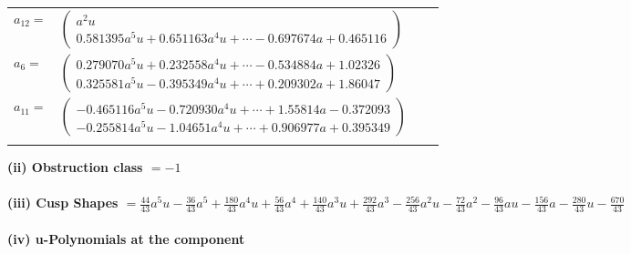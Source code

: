 \documentclass[1p]{elsarticle_modified}
\theoremstyle{definition}
\begin{document}
\begin{tabular}{m{7pt} m{180pt} m{7pt} m{180pt} }
\flushright $a_{12}=$&$\begin{pmatrix}a^2 u\\0.581395 a^{5} u+0.651163 a^{4} u+\cdots-0.697674 a+0.465116\end{pmatrix}$ \\
\flushright $a_{6}=$&$\begin{pmatrix}0.279070 a^{5} u+0.232558 a^{4} u+\cdots-0.534884 a+1.02326\\0.325581 a^{5} u-0.395349 a^{4} u+\cdots+0.209302 a+1.86047\end{pmatrix}$ \\
\flushright $a_{11}=$&$\begin{pmatrix}-0.465116 a^{5} u-0.720930 a^{4} u+\cdots+1.55814 a-0.372093\\-0.255814 a^{5} u-1.04651 a^{4} u+\cdots+0.906977 a+0.395349\end{pmatrix}$\\&\end{tabular}
\flushleft \textbf{(ii) Obstruction class $= -1$}\\~\\
\flushleft \textbf{(iii) Cusp Shapes $= \frac{44}{43} a^5 u-\frac{36}{43} a^5+\frac{180}{43} a^4 u+\frac{56}{43} a^4+\frac{140}{43} a^3 u+\frac{292}{43} a^3-\frac{256}{43} a^2 u-\frac{72}{43} a^2-\frac{96}{43} a u-\frac{156}{43} a-\frac{280}{43} u-\frac{670}{43}$}\\~\\
\newpage\renewcommand{\arraystretch}{1}
\flushleft \textbf{(iv) u-Polynomials at the component}\newline \\
\end{document}
